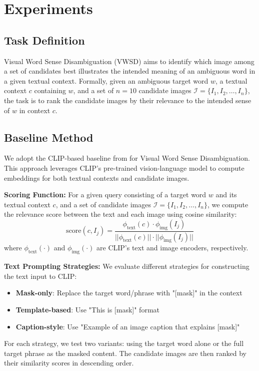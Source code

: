 \documentclass[11pt]{article}
\begin{document}
\section{Experiments}

\subsection{Task Definition}
\label{subsec:task_definition}

Visual Word Sense Disambiguation (VWSD) aims to identify which image among a set of candidates best illustrates the intended meaning of an ambiguous word in a given textual context. Formally, given an ambiguous target word $w$, a textual context $c$ containing $w$, and a set of $n=10$ candidate images $\mathcal{I} = \{I_1, I_2, \ldots, I_n\}$, the task is to rank the candidate images by their relevance to the intended sense of $w$ in context $c$.

\subsection{Baseline Method}
\label{subsec:baseline_method}
We adopt the CLIP-based baseline from \citet{raganato-etal-2023-semeval} for Visual Word Sense Disambiguation. This approach leverages CLIP's pre-trained vision-language model to compute embeddings for both textual contexts and candidate images.

\textbf{Scoring Function:} For a given query consisting of a target word $w$ and its textual context $c$, and a set of candidate images $\mathcal{I} = \{I_1, I_2, \ldots, I_n\}$, we compute the relevance score between the text and each image using cosine similarity:
\begin{equation}
\text{score}(c, I_j) = \frac{\phi_{\text{text}}(c) \cdot \phi_{\text{img}}(I_j)}{||\phi_{\text{text}}(c)|| \cdot ||\phi_{\text{img}}(I_j)||}
\end{equation}
where $\phi_{\text{text}}(\cdot)$ and $\phi_{\text{img}}(\cdot)$ are CLIP's text and image encoders, respectively.

\textbf{Text Prompting Strategies:} We evaluate different strategies for constructing the text input to CLIP:
\begin{itemize}
\item \textbf{Mask-only}: Replace the target word/phrase with "[mask]" in the context
\item \textbf{Template-based}: Use "This is [mask]" format
\item \textbf{Caption-style}: Use "Example of an image caption that explains [mask]"
\end{itemize}
For each strategy, we test two variants: using the target word alone or the full target phrase as the masked content. The candidate images are then ranked by their similarity scores in descending order.
\end{document}
